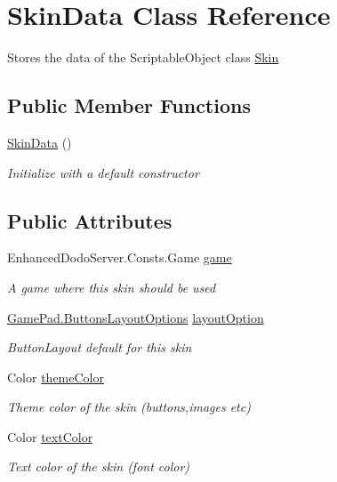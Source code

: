 \hypertarget{class_skin_data}{}\section{Skin\+Data Class Reference}
\label{class_skin_data}


Stores the data of the Scriptable\+Object class \mbox{\hyperlink{class_skin}{Skin}}  


\subsection*{Public Member Functions}
\begin{DoxyCompactItemize}
\item 
\mbox{\hyperlink{class_skin_data_a367ece792b787e086e03151342a7af91}{Skin\+Data}} ()
\begin{DoxyCompactList}\small\item\em Initialize with a default constructor \end{DoxyCompactList}\end{DoxyCompactItemize}
\subsection*{Public Attributes}
\begin{DoxyCompactItemize}
\item 
Enhanced\+Dodo\+Server.\+Consts.\+Game \mbox{\hyperlink{class_skin_data_a2060d1b97558d486f33d51d17fd074be}{game}}
\begin{DoxyCompactList}\small\item\em A game where this skin should be used \end{DoxyCompactList}\item 
\mbox{\hyperlink{namespace_game_pad_ad65f651e47321df25402246e8df26c37}{Game\+Pad.\+Buttons\+Layout\+Options}} \mbox{\hyperlink{class_skin_data_a9d1a9f6e0a92e6e42801c2145a892ebb}{layout\+Option}}
\begin{DoxyCompactList}\small\item\em Button\+Layout default for this skin \end{DoxyCompactList}\item 
Color \mbox{\hyperlink{class_skin_data_a07cca876d8c8ea7304053cc7b73f234e}{theme\+Color}}
\begin{DoxyCompactList}\small\item\em Theme color of the skin (buttons,images etc) \end{DoxyCompactList}\item 
Color \mbox{\hyperlink{class_skin_data_af702a25c46f12f09fbd877cf448f5a59}{text\+Color}}
\begin{DoxyCompactList}\small\item\em Text color of the skin (font color) \end{DoxyCompactList}\end{DoxyCompactItemize}


